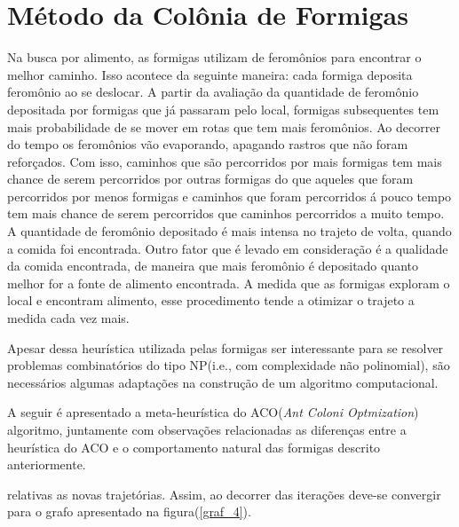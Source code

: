 \section{Método da Colônia de Formigas}

Na busca por alimento, as formigas utilizam de feromônios para encontrar o melhor caminho.
Isso acontece da seguinte maneira: cada formiga deposita feromônio ao se deslocar. A partir
da avaliação da quantidade de feromônio depositada por formigas que já passaram pelo local,
formigas subsequentes tem mais probabilidade de se mover em rotas que tem mais feromônios. Ao
decorrer do tempo os feromônios vão evaporando, apagando rastros que não foram reforçados. 
Com isso, caminhos que são percorridos por mais formigas tem mais chance de serem 
percorridos por outras formigas do que aqueles que foram percorridos por menos formigas e 
caminhos que foram percorridos á pouco tempo tem mais chance de serem percorridos que caminhos
percorridos a muito tempo. A quantidade de feromônio depositado é mais intensa no trajeto de volta,
quando a comida foi encontrada. Outro fator que é levado em consideração é a qualidade da comida
encontrada, de maneira que mais feromônio é depositado quanto melhor for a fonte de alimento encontrada.
A medida que as formigas exploram o local e encontram alimento, esse procedimento tende a otimizar o
trajeto a medida cada vez mais.

Apesar dessa heurística utilizada pelas formigas ser interessante para se resolver problemas combinatórios 
do tipo NP(i.e., com complexidade não polinomial), são necessários algumas adaptações na construção
de um algoritmo computacional. 

A seguir é apresentado a meta-heurística do ACO(\textit{Ant Coloni Optmization}) algoritmo, juntamente com observações relacionadas as diferenças
entre a heurística do ACO e o comportamento natural das formigas descrito anteriormente.


relativas as novas trajetórias. Assim, ao decorrer das iterações deve-se convergir para o grafo apresentado na figura(\ref{graf_4}).
